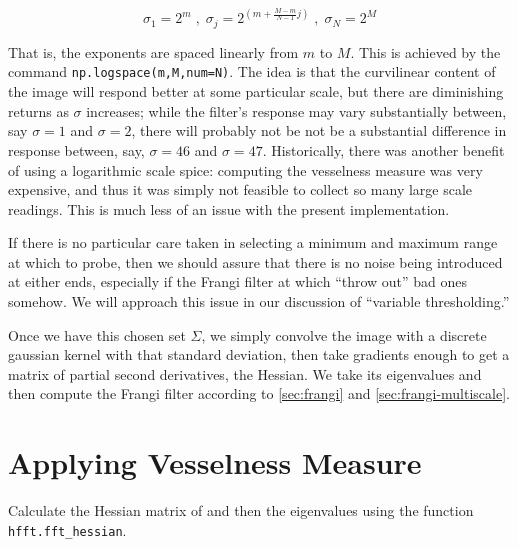 	\begin{equation}
	\sigma_1 = 2^{m} \; , \; \sigma_{j} = 2^{\left(m+\frac{M-m}{N-1}j\right)} \; , \; \sigma_N = 2^{M} \end{equation}
	
	That is, the exponents are spaced linearly from $m$ to $M$. This is achieved by the command
	\texttt{np.logspace(m,M,num=N)}. The idea is that the curvilinear content of the image will respond better at some particular scale, but there are diminishing returns as $\sigma$ increases; while the filter's response may vary substantially between, say $\sigma=1$ and $\sigma=2$, there will probably not be not be a substantial difference in response between, say, $\sigma=46$ and $\sigma=47$. Historically, there was another benefit of using a logarithmic scale spice: computing the vesselness measure was very expensive, and thus it was simply not feasible to collect so many large scale readings. This is much less of an issue with the present implementation.
	
	If there is no particular care taken in selecting a minimum and maximum range at which to probe, then we should assure that there is no noise being introduced at either ends, especially if the Frangi filter at which ``throw out'' bad ones somehow. We will approach this issue in our discussion of ``variable thresholding.''
	
	Once we have this chosen set $\Sigma$, we simply convolve the image with a discrete gaussian kernel with that standard deviation, then take gradients enough to get a matrix of partial second derivatives, the Hessian. We take its eigenvalues and then compute the Frangi filter according to \cref{sec:frangi} and \cref{sec:frangi-multiscale}.

\section{Applying Vesselness Measure}
Calculate the Hessian matrix of and then the eigenvalues using the function \texttt{hfft.fft\_hessian}.


